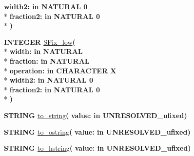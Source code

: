 \begin{DoxyCompactItemize}
{\bfseries \textcolor{vhdlchar}{width2\+: }\textcolor{stringliteral}{in }\textcolor{vhdlchar}{N\+A\+T\+U\+R\+A\+L   0}}\\*
{\bfseries \textcolor{vhdlchar}{fraction2\+: }\textcolor{stringliteral}{in }\textcolor{vhdlchar}{N\+A\+T\+U\+R\+A\+L   0}}\\*
{\bfseries  )} 
\item 
{\bfseries {\bfseries \textcolor{comment}{I\+N\+T\+E\+G\+E\+R}\textcolor{vhdlchar}{ }}} \hyperlink{classfixed__pkg_a4c5c338ece1c09aec7fcbe83dd0859cf}{S\+Fix\+\_\+low}{\bfseries  ( }\\*
{\bfseries \textcolor{vhdlchar}{width\+: }\textcolor{stringliteral}{in }{\bfseries \textcolor{comment}{N\+A\+T\+U\+R\+A\+L}\textcolor{vhdlchar}{ }}}\\*
{\bfseries \textcolor{vhdlchar}{fraction\+: }\textcolor{stringliteral}{in }{\bfseries \textcolor{comment}{N\+A\+T\+U\+R\+A\+L}\textcolor{vhdlchar}{ }}}\\*
{\bfseries \textcolor{vhdlchar}{operation\+: }\textcolor{stringliteral}{in }\textcolor{vhdlchar}{C\+H\+A\+R\+A\+C\+T\+E\+R   \textquotesingle{}\+X\textquotesingle{}}}\\*
{\bfseries \textcolor{vhdlchar}{width2\+: }\textcolor{stringliteral}{in }\textcolor{vhdlchar}{N\+A\+T\+U\+R\+A\+L   0}}\\*
{\bfseries \textcolor{vhdlchar}{fraction2\+: }\textcolor{stringliteral}{in }\textcolor{vhdlchar}{N\+A\+T\+U\+R\+A\+L   0}}\\*
{\bfseries  )} 
\item 
{\bfseries {\bfseries \textcolor{comment}{S\+T\+R\+I\+N\+G}\textcolor{vhdlchar}{ }}} \hyperlink{classfixed__pkg_af56ceef013a6410cf13e94e989da4d33}{to\+\_\+string}{\bfseries  ( }{\bfseries \textcolor{vhdlchar}{value\+: }\textcolor{stringliteral}{in }\textcolor{vhdlchar}{U\+N\+R\+E\+S\+O\+L\+V\+E\+D\+\_\+ufixed}}{\bfseries  )} 
\item 
{\bfseries {\bfseries \textcolor{comment}{S\+T\+R\+I\+N\+G}\textcolor{vhdlchar}{ }}} \hyperlink{classfixed__pkg_aa4e5c418f084f52cb97589cd0ea72a57}{to\+\_\+ostring}{\bfseries  ( }{\bfseries \textcolor{vhdlchar}{value\+: }\textcolor{stringliteral}{in }\textcolor{vhdlchar}{U\+N\+R\+E\+S\+O\+L\+V\+E\+D\+\_\+ufixed}}{\bfseries  )} 
\item 
{\bfseries {\bfseries \textcolor{comment}{S\+T\+R\+I\+N\+G}\textcolor{vhdlchar}{ }}} \hyperlink{classfixed__pkg_a8edf96017c02c0534882acdd5058d739}{to\+\_\+hstring}{\bfseries  ( }{\bfseries \textcolor{vhdlchar}{value\+: }\textcolor{stringliteral}{in }\textcolor{vhdlchar}{U\+N\+R\+E\+S\+O\+L\+V\+E\+D\+\_\+ufixed}}{\bfseries  )} 

\end{DoxyCompactItemize}
